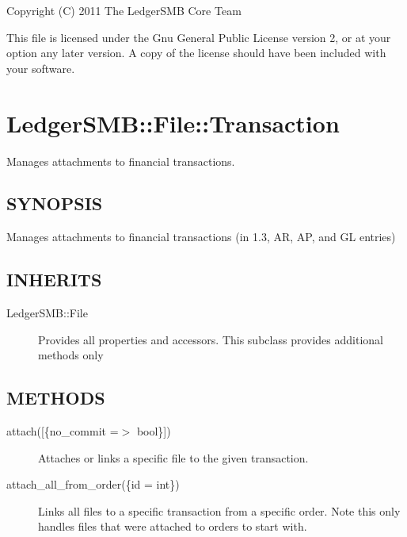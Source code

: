 \begin{description}
\begin{description}
\begin{description}
\begin{description}
\begin{description}
Copyright (C) 2011 The LedgerSMB Core Team



This file is licensed under the Gnu General Public License version 2, or at your
option any later version.  A copy of the license should have been included with
your software.

\section{LedgerSMB::File::Transaction\label{LedgerSMB::File::Transaction}}


Manages attachments to financial transactions.

\subsection*{SYNOPSIS\label{LedgerSMB::File::Transaction_SYNOPSIS}}


Manages attachments to financial transactions (in 1.3, AR, AP, and GL entries)

\subsection*{INHERITS\label{LedgerSMB::File::Transaction_INHERITS}}
\begin{description}

\item[{LedgerSMB::File}] \mbox{}

Provides all properties and accessors.  This subclass provides additional 
methods only

\end{description}
\subsection*{METHODS\label{LedgerSMB::File::Transaction_METHODS}}
\begin{description}

\item[{attach([\{no\_commit =$>$ bool\}])}] \mbox{}

Attaches or links a specific file to the given transaction.


\item[{attach\_all\_from\_order(\{id = int\})}] \mbox{}

Links all files to a specific transaction from a specific order.  Note this 
only handles files that were attached to orders to start with.


\end{description}
\end{description}
\end{description}
\end{description}
\end{description}
\end{description}

